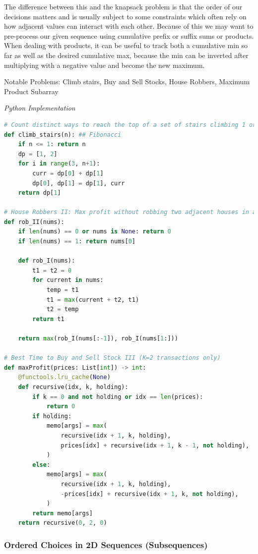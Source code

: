 \documentclass{article}
\begin{document}
The difference between this and the knapsack problem is that the order of our decisions matters and is usually subject to some constraints which often rely on how adjacent values can interact with each other. Because of this we may want to pre-process our given sequence using cumulative prefix or suffix sums or products. When dealing with products, it can be useful to track both a cumulative min so far as well as the desired cumulative max, because the min can be inverted after multiplying with a negative value and become the new maximum.

Notable Problems: Climb stairs, Buy and Sell Stocks, House Robbers, Maximum Product Subarray

\vspace{8pt} \emph{Python Implementation}
\begin{lstlisting}[language=Python]
# Count distinct ways to reach the top of a set of stairs climbing 1 or 2 steps at a time
def climb_stairs(n): ## Fibonacci
    if n <= 1: return n
    dp = [1, 2]
    for i in range(3, n+1):
        curr = dp[0] + dp[1]
        dp[0], dp[1] = dp[1], curr
    return dp[1]

# House Robbers II: Max profit without robbing two adjacent houses in a circular street
def rob_II(nums):
    if len(nums) == 0 or nums is None: return 0
    if len(nums) == 1: return nums[0]
        
    def rob_I(nums):
        t1 = t2 = 0
        for current in nums:
            temp = t1
            t1 = max(current + t2, t1)
            t2 = temp
        return t1
    
    return max(rob_I(nums[:-1]), rob_I(nums[1:]))

# Best Time to Buy and Sell Stock III (K=2 transactions only)
def maxProfit(prices: List[int]) -> int:
    @functools.lru_cache(None)
    def recursive(idx, k, holding):
        if k == 0 and not holding or idx == len(prices):
            return 0
        if holding:
            memo[args] = max(
                recursive(idx + 1, k, holding),
                prices[idx] + recursive(idx + 1, k - 1, not holding),
            )
        else:
            memo[args] = max(
                recursive(idx + 1, k, holding),
                -prices[idx] + recursive(idx + 1, k, not holding),
            )
        return memo[args]
    return recursive(0, 2, 0)
\end{lstlisting}

\subsubsection*{Ordered Choices in 2D Sequences (Subsequences)}
\end{document}
